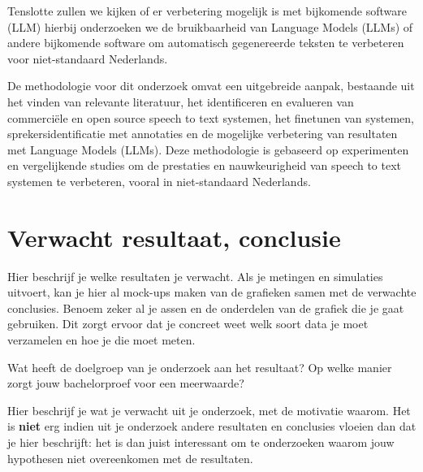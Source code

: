 \par Tenslotte zullen we kijken of er verbetering mogelijk is met bijkomende software (LLM) hierbij onderzoeken we de bruikbaarheid van Language Models (LLMs) of andere bijkomende software om automatisch gegenereerde teksten te verbeteren voor niet-standaard Nederlands.


\par De methodologie voor dit onderzoek omvat een uitgebreide aanpak, bestaande uit het vinden van relevante literatuur, het identificeren en evalueren van commerciële en open source speech to text systemen, het finetunen van systemen, sprekersidentificatie met annotaties en de mogelijke verbetering van resultaten met Language Models (LLMs). Deze methodologie is gebaseerd op experimenten en vergelijkende studies om de prestaties en nauwkeurigheid van speech to text systemen te verbeteren, vooral in niet-standaard Nederlands.

\section{Verwacht resultaat, conclusie}%
\label{sec:verwachte_resultaten}

Hier beschrijf je welke resultaten je verwacht. Als je metingen en simulaties uitvoert, kan je hier al mock-ups maken van de grafieken samen met de verwachte conclusies. Benoem zeker al je assen en de onderdelen van de grafiek die je gaat gebruiken. Dit zorgt ervoor dat je concreet weet welk soort data je moet verzamelen en hoe je die moet meten.

Wat heeft de doelgroep van je onderzoek aan het resultaat? Op welke manier zorgt jouw bachelorproef voor een meerwaarde?

Hier beschrijf je wat je verwacht uit je onderzoek, met de motivatie waarom. Het is \textbf{niet} erg indien uit je onderzoek andere resultaten en conclusies vloeien dan dat je hier beschrijft: het is dan juist interessant om te onderzoeken waarom jouw hypothesen niet overeenkomen met de resultaten.

